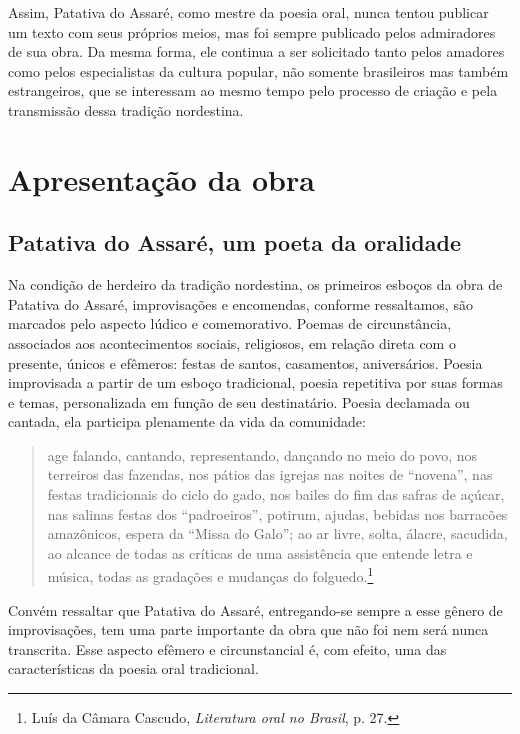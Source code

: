 \noindent Assim, Patativa do Assaré, como mestre da poesia oral, nunca
tentou publicar um texto com seus próprios meios, mas foi sempre publicado pelos
admiradores de sua obra. Da mesma forma, ele continua a ser solicitado tanto
pelos amadores como pelos especialistas da cultura popular, não somente
brasileiros mas também estrangeiros, que se interessam ao mesmo tempo pelo
processo de criação e pela transmissão dessa tradição nordestina.

\section{Apresentação da obra}

\subsection{Patativa do Assaré, um poeta da oralidade}

Na condição de herdeiro da tradição nordestina, os primeiros esboços da obra de
Patativa do Assaré, improvisações e encomendas, conforme ressaltamos, são
marcados pelo aspecto lúdico e comemorativo. Poemas de circunstância, associados
aos acontecimentos sociais, religiosos, em relação direta com o presente, únicos
e efêmeros: festas de santos, casamentos, aniversários. Poesia improvisada a
partir de um esboço tradicional, poesia repetitiva por suas formas e temas,
personalizada em função de seu destinatário. Poesia declamada ou cantada, ela
participa plenamente da vida da comunidade:

\begin{quote}
age falando, cantando,
representando, dançando no meio do povo, nos terreiros das fazendas, nos pátios
das igrejas nas noites de ``novena'', nas festas tradicionais do ciclo do gado,
nos bailes do fim das safras de açúcar, nas salinas festas dos ``padroeiros'',
potirum, ajudas, bebidas nos barracões amazônicos, espera da ``Missa do Galo''; ao
ar livre, solta, álacre, sacudida, ao alcance de todas as críticas de uma
assistência que entende letra e música, todas as gradações e mudanças do
folguedo.\footnote{ Luís da Câmara Cascudo, \textit{Literatura oral no Brasil},
p. 27.}
\end{quote}

\noindent Convém ressaltar que Patativa do Assaré, entregando-se sempre a esse
gênero de improvisações, tem uma parte importante da obra que não foi nem será
nunca transcrita. Esse aspecto efêmero e circunstancial é, com efeito, uma das
características da poesia oral tradicional.

